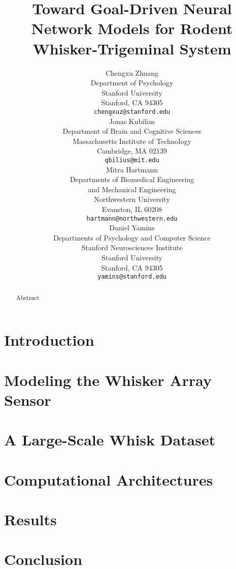 \documentclass{article}
\title{Toward Goal-Driven Neural Network Models for Rodent Whisker-Trigeminal System}
\author{
Chengxu Zhuang\\
Department of Psychology\\
Stanford University\\
Stanford, CA 94305 \\
\texttt{chengxuz@stanford.edu} \\
\And
Jonas Kubilius \\
Department of Brain and Cognitive Sciences \\
Massachusetts Institute of Technology \\
Cambridge, MA  02139\\
\texttt{qbilius@mit.edu} \\
\And
Mitra Hartmann \\
Departments of Biomedical Engineering \\
and Mechanical Engineering \\
Northwestern University \\
Evanston, IL  60208\\
\texttt{hartmann@northwestern.edu} \\
\And
Daniel Yamins \\
Departments of Psychology and Computer Science \\
Stanford Neurosciences Institute \\
Stanford University \\
Stanford, CA 94305 \\
\texttt{yamins@stanford.edu} \\
}
\begin{document}

\maketitle

\begin{abstract}
Abstract
\end{abstract}


\section{Introduction} %


\section{Modeling the Whisker Array Sensor} %


\section{A Large-Scale Whisk Dataset} %


\section{Computational Architectures} %


\section{Results} %


\section{Conclusion}  %




{\small
}

\end{document}
